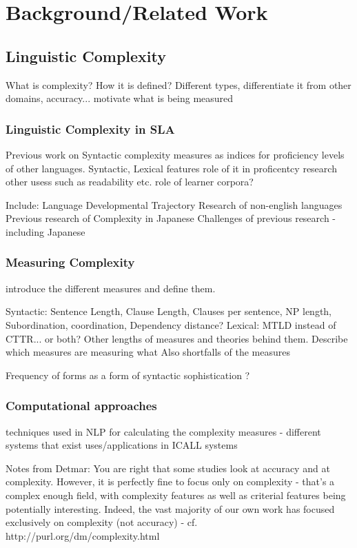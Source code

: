 \chapter{Background/Related Work}

\section{Linguistic Complexity}
What is complexity? How it is defined? Different types, differentiate it from other domains, accuracy...
motivate what is being measured


\subsection{Linguistic Complexity in SLA}
Previous work on Syntactic complexity measures as indices for proficiency levels of other languages.
Syntactic, Lexical features
role of it in proficentcy research
other usess such as readability etc.
role of learner corpora?

Include:
Language Developmental Trajectory
Research of non-english languages
Previous research of Complexity in Japanese
Challenges of previous research - including Japanese


\subsection{Measuring Complexity}
introduce the different measures and define them.

Syntactic:
Sentence Length, Clause Length, Clauses per sentence, NP length, Subordination, coordination, Dependency distance?
Lexical:
MTLD instead of CTTR... or both?
Other lengths of measures and theories behind them. Describe which measures are measuring what Also shortfalls of the
measures


Frequency of forms as a form of syntactic sophistication ? \cite{Ellis2004}
%

\subsection{Computational approaches}
techniques used in NLP for calculating the complexity measures - different systems that exist
uses/applications in ICALL systems




Notes from Detmar:
You are right that some studies look at accuracy and at
complexity. However, it is perfectly fine to focus only on complexity
- that's a complex enough field, with complexity features as well as
criterial features being potentially interesting. Indeed, the vast
majority of our own work has focused exclusively on complexity (not
accuracy) - cf. http://purl.org/dm/complexity.html

